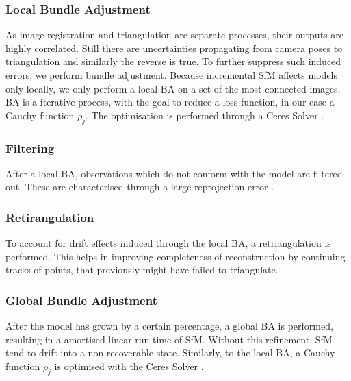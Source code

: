 \documentclass[conference,]{IEEEtran}
\begin{document}
\hypertarget{local-bundle-adjustment}{%
\subsubsection{Local Bundle Adjustment}\label{local-bundle-adjustment}}

As image registration and triangulation are separate processes, their
outputs are highly correlated. Still there are uncertainties propagating
from camera poses to triangulation and similarly the reverse is true. To
further suppress such induced errors, we perform bundle adjustment.
Because incremental SfM affects models only locally, we only perform a
local BA on a set of the most connected images. BA is a iterative
process, with the goal to reduce a loss-function, in our case a Cauchy
function \(\rho_j\). The optimisation is performed through a Ceres
Solver \autocite{ceresso}. \autocite{schönberger2016}

\hypertarget{filtering}{%
\subsubsection{Filtering}\label{filtering}}

After a local BA, observations which do not conform with the model are
filtered out. These are characterised through a large reprojection error
\autocite{wu2013}. \autocite{schönberger2016}

\hypertarget{retirangulation}{%
\subsubsection{Retirangulation}\label{retirangulation}}

To account for drift effects induced through the local BA, a
retriangulation is performed. This helps in improving completeness of
reconstruction by continuing tracks of points, that previously might
have failed to triangulate. \autocite{schönberger2016}

\hypertarget{global-bundle-adjustment}{%
\subsubsection{Global Bundle
Adjustment}\label{global-bundle-adjustment}}

After the model has grown by a certain percentage, a global BA is
performed, resulting in a amortised linear run-time of SfM. Without this
refinement, SfM tend to drift into a non-recoverable state. Similarly,
to the local BA, a Cauchy function \(\rho_j\) is optimised with the
Ceres Solver \autocite{ceresso}. \autocite{schönberger2016}
\end{document}
